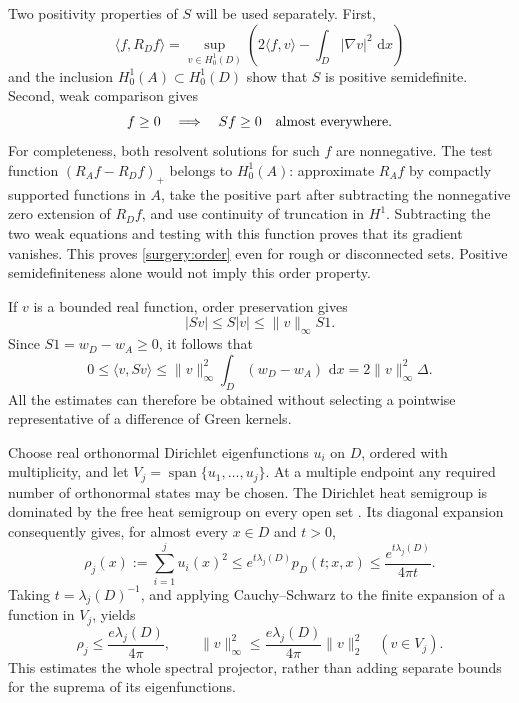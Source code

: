 \documentclass[11pt,reqno]{amsart}
\numberwithin{equation}{section}
\newcommand{\dd}{\,\mathrm d}
\newcommand{\abs}[1]{\lvert#1\rvert}
\newcommand{\norm}[1]{\lVert#1\rVert}
\begin{document}
Two positivity properties of \(S\) will be used separately.  First,
\[
 \langle f,R_Df\rangle
 =\sup_{v\in H^1_0(D)}
       \left(2\langle f,v\rangle-\int_D\abs{\nabla v}^2\,\dd x\right)
\]
and the inclusion \(H^1_0(A)\subset H^1_0(D)\) show that \(S\) is positive
semidefinite.  Second, weak comparison gives
\begin{equation}
 f\ge0\quad\Longrightarrow\quad Sf\ge0\quad\hbox{almost everywhere}.
 \label{surgery:order}
\end{equation}
For completeness, both resolvent solutions for such \(f\) are
nonnegative.  The test function
\((R_Af-R_Df)_+\) belongs to \(H^1_0(A)\): approximate \(R_Af\) by
compactly supported functions in \(A\), take the positive part after
subtracting the nonnegative zero extension of \(R_Df\), and use
continuity of truncation in \(H^1\).  Subtracting the two weak equations
and testing with this function proves that its gradient vanishes.
This proves \eqref{surgery:order} even for rough or disconnected sets.
Positive semidefiniteness alone would not imply this order property.

If \(v\) is a bounded real function, order preservation gives
\[
 \abs{Sv}\le S\abs v\le \norm v_\infty S1.
\]
Since \(S1=w_D-w_A\ge0\), it follows that
\begin{equation}
 0\le \langle v,Sv\rangle
 \le \norm v_\infty^2\int_D(w_D-w_A)\,\dd x
 =2\norm v_\infty^2\Delta.
 \label{surgery:bounded-quadratic}
\end{equation}
All the estimates can therefore be obtained without selecting a
pointwise representative of a difference of Green kernels.

Choose real orthonormal Dirichlet eigenfunctions \(u_i\) on \(D\),
ordered with multiplicity, and let \(V_j=\operatorname{span}
\{u_1,\ldots,u_j\}\).  At a multiple endpoint any required number of
orthonormal states may be chosen.  The Dirichlet heat semigroup is
dominated by the free heat semigroup on every open set
\cite{Davies1989}.  Its diagonal expansion consequently gives, for
almost every \(x\in D\) and \(t>0\),
\[
 \rho_j(x):=\sum_{i=1}^j u_i(x)^2
 \le e^{t\lambda_j(D)}p_D(t;x,x)
 \le \frac{e^{t\lambda_j(D)}}{4\pi t}.
\]
Taking \(t=\lambda_j(D)^{-1}\), and applying Cauchy--Schwarz to the
finite expansion of a function in \(V_j\), yields
\begin{equation}
 \rho_j\le\frac{e\lambda_j(D)}{4\pi},
 \qquad
 \norm v_\infty^2\le
       \frac{e\lambda_j(D)}{4\pi}\norm v_2^2
       \quad(v\in V_j).
 \label{surgery:heat-projector}
\end{equation}
This estimates the whole spectral projector, rather than adding
separate bounds for the suprema of its eigenfunctions.
\end{document}
